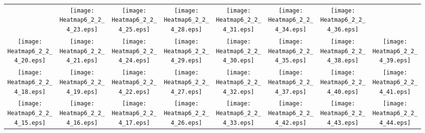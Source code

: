 \documentclass{standalone}
\begin{document}
\renewcommand{\arraystretch}{0}
\setlength{\tabcolsep}{0pt}
\begin{tabular}{ *8{c} }
 & \texttt{[image: Heatmap6\_2\_2\_4\_23.eps]} & \texttt{[image: Heatmap6\_2\_2\_4\_25.eps]} & \texttt{[image: Heatmap6\_2\_2\_4\_28.eps]} & \texttt{[image: Heatmap6\_2\_2\_4\_31.eps]} & \texttt{[image: Heatmap6\_2\_2\_4\_34.eps]} & \texttt{[image: Heatmap6\_2\_2\_4\_36.eps]} &  \\
\texttt{[image: Heatmap6\_2\_2\_4\_20.eps]} & \texttt{[image: Heatmap6\_2\_2\_4\_21.eps]} & \texttt{[image: Heatmap6\_2\_2\_4\_24.eps]} & \texttt{[image: Heatmap6\_2\_2\_4\_29.eps]} & \texttt{[image: Heatmap6\_2\_2\_4\_30.eps]} & \texttt{[image: Heatmap6\_2\_2\_4\_35.eps]} & \texttt{[image: Heatmap6\_2\_2\_4\_38.eps]} & \texttt{[image: Heatmap6\_2\_2\_4\_39.eps]} \\
\texttt{[image: Heatmap6\_2\_2\_4\_18.eps]} & \texttt{[image: Heatmap6\_2\_2\_4\_19.eps]} & \texttt{[image: Heatmap6\_2\_2\_4\_22.eps]} & \texttt{[image: Heatmap6\_2\_2\_4\_27.eps]} & \texttt{[image: Heatmap6\_2\_2\_4\_32.eps]} & \texttt{[image: Heatmap6\_2\_2\_4\_37.eps]} & \texttt{[image: Heatmap6\_2\_2\_4\_40.eps]} & \texttt{[image: Heatmap6\_2\_2\_4\_41.eps]} \\
\texttt{[image: Heatmap6\_2\_2\_4\_15.eps]} & \texttt{[image: Heatmap6\_2\_2\_4\_16.eps]} & \texttt{[image: Heatmap6\_2\_2\_4\_17.eps]} & \texttt{[image: Heatmap6\_2\_2\_4\_26.eps]} & \texttt{[image: Heatmap6\_2\_2\_4\_33.eps]} & \texttt{[image: Heatmap6\_2\_2\_4\_42.eps]} & \texttt{[image: Heatmap6\_2\_2\_4\_43.eps]} & \texttt{[image: Heatmap6\_2\_2\_4\_44.eps]} \\

\end{tabular}
\end{document}
